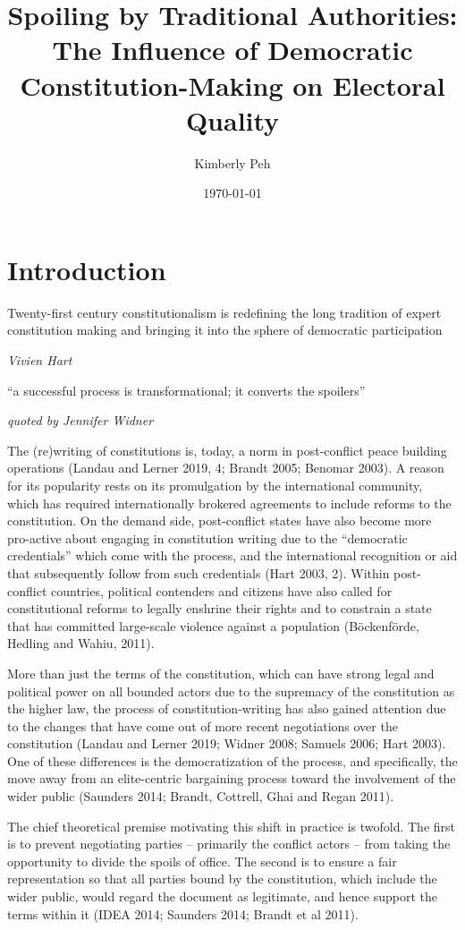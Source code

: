\documentclass [11pt]{article}
\title{Spoiling by Traditional Authorities: The Influence of Democratic Constitution-Making on Electoral Quality}
\author{Kimberly Peh}
\date{\today}
\begin{document}
\maketitle

\section*{Introduction} 

\epigraph{Twenty-first century constitutionalism is redefining the long tradition of expert constitution making and bringing it into the sphere of democratic participation}{\emph{Vivien Hart}}
\epigraph{``a successful process is transformational; it converts the spoilers''}{\emph{quoted by Jennifer Widner}}

The (re)writing of constitutions is, today, a norm in post-conflict peace building operations (Landau and Lerner 2019, 4; Brandt 2005; Benomar 2003). A reason for its popularity rests on its promulgation by the international community, which has required internationally brokered agreements to include reforms to the constitution. On the demand side, post-conflict states have also become more pro-active about engaging in constitution writing due to the ``democratic credentials'' which come with the process, and the international recognition or aid that subsequently follow from such credentials (Hart 2003, 2). Within post-conflict countries, political contenders and citizens have also called for constitutional reforms to legally enshrine their rights and to constrain a state that has committed large-scale violence against a population (Böckenförde, Hedling and Wahiu, 2011).

More than just the terms of the constitution, which can have strong legal and political power on all bounded actors due to the supremacy of the constitution as the higher law, the process of constitution-writing has also gained attention due to the changes that have come out of more recent negotiations over the constitution (Landau and Lerner 2019; Widner 2008; Samuels 2006; Hart 2003). One of these differences is the democratization of the process, and specifically, the move away from an elite-centric bargaining process toward the involvement of the wider public (Saunders 2014; Brandt, Cottrell, Ghai and Regan 2011).

The chief theoretical premise motivating this shift in practice is twofold. The first is to prevent negotiating parties -- primarily the conflict actors -- from taking the opportunity to divide the spoils of office. The second is to ensure a fair representation so that all parties bound by the constitution, which include the wider public, would regard the document as legitimate, and hence support the terms within it (IDEA 2014; Saunders 2014; Brandt et al 2011).
\end{document}
